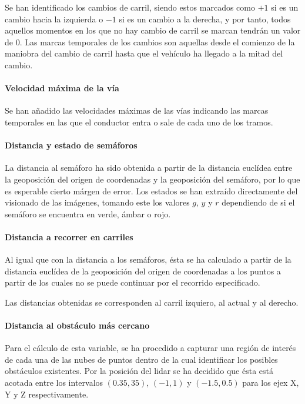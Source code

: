 Se han identificado los cambios de carril, siendo estos marcados como $+1$ si es un cambio hacia la izquierda o $-1$ si es un cambio a la derecha, y por tanto, todos aquellos momentos en los que no hay cambio de carril se marcan tendrán un valor de $0$. Las marcas temporales de los cambios son aquellas desde el comienzo de la maniobra del cambio de carril hasta que el vehículo ha llegado a la mitad del cambio.

\paragraph{Velocidad máxima de la vía}

Se han añadido las velocidades máximas de las vías indicando las marcas temporales en las que el conductor entra o sale de cada uno de los tramos.

\paragraph{Distancia y estado de semáforos}

La distancia al semáforo ha sido obtenida a partir de la distancia euclídea entre la geoposición del origen de coordenadas y la geoposición del semáforo, por lo que es esperable cierto márgen de error. Los estados se han extraído directamente del visionado de las imágenes, tomando este los valores $g$, $y$ y $r$ dependiendo de si el semáforo se encuentra en verde, ámbar o rojo.

\paragraph{Distancia a recorrer en carriles}

Al igual que con la distancia a los semáforos, ésta se ha calculado a partir de la distancia euclídea de la geoposición del origen de coordenadas a los puntos a partir de los cuales no se puede continuar por el recorrido especificado.

Las distancias obtenidas se corresponden al carril izquiero, al actual y al derecho.

\paragraph{Distancia al obstáculo más cercano}

Para el cálculo de esta variable, se ha procedido a capturar una región de interés de cada una de las nubes de puntos dentro de la cual identificar los posibles obstáculos existentes. Por la posición del lidar se ha decidido que ésta está acotada entre los intervalos $(0.35, 35)$, $(-1, 1)$ y $(-1.5, 0.5)$ para los ejex X, Y y Z respectivamente.

